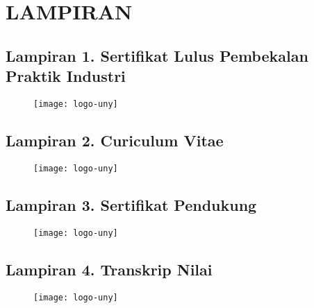 
\appendix
\chapter*{LAMPIRAN}


\section*{Lampiran 1. Sertifikat Lulus Pembekalan Praktik Industri}
\begin{figure}[H]
	\centering
	\texttt{[image: logo-uny]}
\end{figure}

\newpage

\section*{Lampiran 2. Curiculum Vitae}
\begin{figure}[H]
	\centering
	\texttt{[image: logo-uny]}
\end{figure}

\newpage

\section*{Lampiran 3. Sertifikat Pendukung}
\begin{figure}[H]
	\centering
	\texttt{[image: logo-uny]}
\end{figure}

\newpage

\section*{Lampiran 4. Transkrip Nilai}
\begin{figure}[H]
	\centering
	\texttt{[image: logo-uny]}
\end{figure}

\newpage

